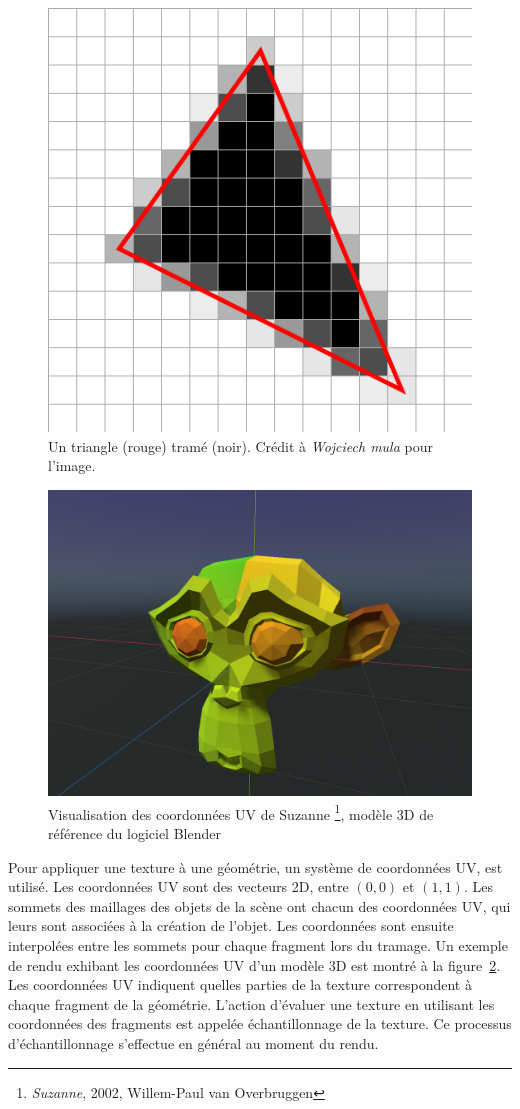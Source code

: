 \begin{figure}[h]
    \centering
    \includegraphics[width=.55\textwidth]{contenu/resources/images/rasterization}
    \caption[Tramage d'un triangle]{Un triangle (rouge) tramé (noir). Crédit à \textit{Wojciech mula} pour l'image.}
    \label{fig:rasterization}
\end{figure}

\bigskip

\begin{figure}
    \centering
    \includegraphics[width=.55\textwidth]{contenu/resources/images/uv_suzanne}
    \caption[Coordonnées UV du modèle Suzanne]{Visualisation des coordonnées UV de Suzanne \footnote{\textit{Suzanne}, 2002, Willem-Paul van Overbruggen}, modèle 3D de référence du logiciel Blender}
    \label{fig:uv-suzanne}
\end{figure}

Pour appliquer une texture à une géométrie, un système de coordonnées UV, est utilisé. Les coordonnées UV sont des vecteurs 2D, entre $(0, 0)$ et $(1, 1)$. Les sommets des maillages des objets de la scène ont chacun des coordonnées UV, qui leurs sont associées à la création de l'objet. Les coordonnées sont ensuite interpolées entre les sommets pour chaque fragment lors du tramage. Un exemple de rendu exhibant les coordonnées UV d'un modèle 3D est montré à la figure~\ref{fig:uv-suzanne}. Les coordonnées UV indiquent quelles parties de la texture correspondent à chaque fragment de la géométrie. L'action d'évaluer une texture en utilisant les coordonnées des fragments est appelée échantillonnage de la texture. Ce processus d'échantillonnage s'effectue en général au moment du rendu.

